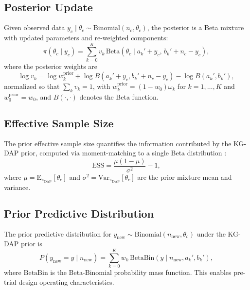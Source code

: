\documentclass[12pt]{article}
\newcommand{\thetac}{\theta_c}
\newcommand{\piDAP}{\pi_{\mathrm{DAP}}}
\newcommand{\ESS}{\mathrm{ESS}}
\begin{document}
\subsection{Posterior Update}
\label{sec:posterior}

Given observed data $y_c \mid \thetac \sim \mathrm{Binomial}(n_c, \thetac)$, the posterior is a Beta mixture with updated parameters and re-weighted components:
\begin{equation}
\pi(\thetac \mid y_c) = \sum_{k=0}^{K} v_k \, \mathrm{Beta}(\thetac \mid a_k' + y_c, \, b_k' + n_c - y_c),
\label{eq:posterior}
\end{equation}
where the posterior weights are
\begin{equation}
\log v_k = \log w_k^{\mathrm{prior}} + \log B(a_k' + y_c, b_k' + n_c - y_c) - \log B(a_k', b_k'),
\label{eq:posterior_weights}
\end{equation}
normalized so that $\sum_k v_k = 1$, with $w_k^{\mathrm{prior}} = (1 - w_0)\omega_k$ for $k = 1, \ldots, K$ and $w_0^{\mathrm{prior}} = w_0$, and $B(\cdot, \cdot)$ denotes the Beta function.

\subsection{Effective Sample Size}
\label{sec:ess}

The prior effective sample size quantifies the information contributed by the KG-DAP prior, computed via moment-matching to a single Beta distribution \citep{morita2008determining}:
\begin{equation}
\ESS = \frac{\mu(1 - \mu)}{\sigma^2} - 1,
\label{eq:ess}
\end{equation}
where $\mu = \mathrm{E}_{\piDAP}[\thetac]$ and $\sigma^2 = \mathrm{Var}_{\piDAP}[\thetac]$ are the prior mixture mean and variance.

\subsection{Prior Predictive Distribution}
\label{sec:predictive}

The prior predictive distribution for $y_{\mathrm{new}} \sim \mathrm{Binomial}(n_{\mathrm{new}}, \thetac)$ under the KG-DAP prior is
\begin{equation}
P(y_{\mathrm{new}} = y \mid n_{\mathrm{new}}) = \sum_{k=0}^{K} w_k \, \mathrm{BetaBin}(y \mid n_{\mathrm{new}}, a_k', b_k'),
\label{eq:predictive}
\end{equation}
where $\mathrm{BetaBin}$ is the Beta-Binomial probability mass function. This enables pre-trial design operating characteristics.
\end{document}
